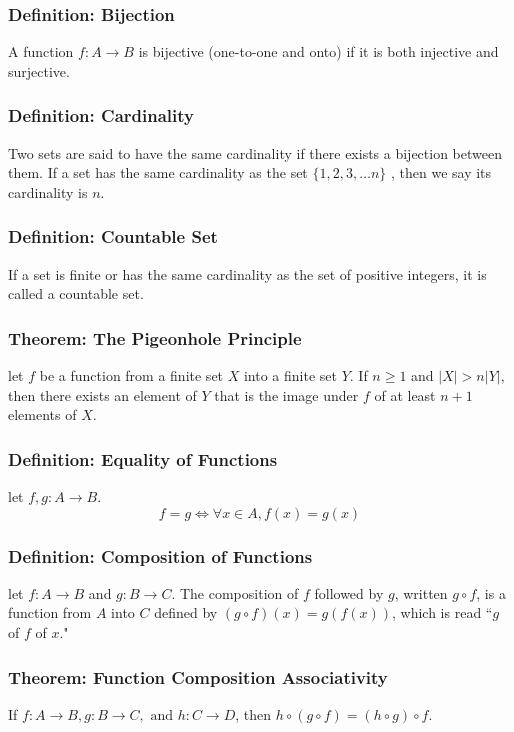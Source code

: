 \documentclass{article}
\begin{document}
\subsubsection*{Definition: Bijection}
A function $f: A \rightarrow B$ is bijective (one-to-one and onto) if it is both injective and surjective. 

\subsubsection*{Definition: Cardinality}
Two sets are said to have the same cardinality if there exists a bijection between them. If a set has the same cardinality as the set $\{1, 2, 3, \dots n \}$ , then we say its cardinality is $n$. 

\subsubsection*{Definition: Countable Set}
If a set is finite or has the same cardinality as the set of positive integers, it is called a countable set. 

\subsubsection*{Theorem: The Pigeonhole Principle}
let $f$ be a function from a finite set $X$ into a finite set $Y$. If $n \geq 1$ and $|X| > n |Y|$, then there exists an element of $Y$ that is the image under $f$ of at least $n+1$ elements of $X$. 

\subsubsection*{Definition: Equality of Functions}
let $f, g : A \rightarrow B$. $$f = g \iff \forall x \in A, f(x) = g(x)$$

\subsubsection*{Definition: Composition of Functions}
let $f: A \rightarrow B$ and $g: B \rightarrow C$. The composition of $f$ followed by $g$, written $g \circ f$, is a function from $A$ into $C$ defined by $(g \circ f)(x) = g(f(x))$, which is read ``$g$ of $f$ of $x$."

\subsubsection*{Theorem: Function Composition Associativity}
If $f: A \rightarrow B, g: B \rightarrow C, \text{ and } h: C \rightarrow D$, then $h \circ ( g \circ f) = (h \circ g) \circ f$.
\end{document}
